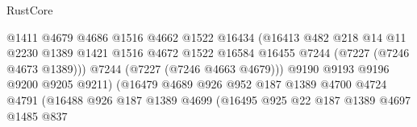 \begin{lexlean}{RustCore}
\begin{coremodule}
                                            @1411
                                            @4679
                                            @4686
                                            @1516
                                            @4662
                                            @1522
                                            @16434
                                            (@16413
                                              @482
                                              @218
                                              @14
                                              @11
                                              @2230
                                              @1389
                                              @1421
                                              @1516
                                              @4672
                                              @1522
                                              @16584
                                              @16455
                                              @7244
                                              (@7227 (@7246 @4673 @1389)))
                                            @7244
                                            (@7227 (@7246 @4663 @4679)))
                                          @9190
                                          @9193
                                          @9196
                                          @9200
                                          @9205
                                          @9211)
                                        (@16479
                                          @4689
                                          @926
                                          @952
                                          @187
                                          @1389
                                          @4700
                                          @4724
                                          @4791
                                          (@16488
                                            @926
                                            @187
                                            @1389
                                            @4699
                                            (@16495
                                              @925
                                              @22
                                              @187
                                              @1389
                                              @4697
                                              @1485
                                              @837

\end{coremodule}
\end{lexlean}
